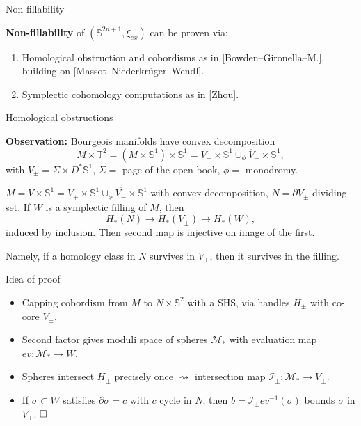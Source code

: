 \documentclass{beamer}
\begin{document}
\begin{frame}{Non-fillability}

\textbf{Non-fillability} of $(\mathbb S^{2n+1},\xi_{ex})$ can be proven via:

\begin{enumerate}
    \item Homological obstruction and cobordisms as in [Bowden--Gironella--M.], building on [Massot--Niederkr\"uger--Wendl].
    \item Symplectic cohomology computations as in [Zhou].
\end{enumerate}

\end{frame}

\begin{frame}{Homological obstructions}

\textbf{Observation:} Bourgeois manifolds have convex decomposition $$M\times \mathbb T^2=(M\times \mathbb S^1)\times \mathbb S^1= V_+\times \mathbb S^1 \cup_\phi \overline{V}_-\times \mathbb S^1,$$ with $V_\pm=\Sigma \times D^*\mathbb S^1$, $\Sigma=$ page of the open book, $\phi=$ monodromy.

\pause

\begin{theorem}

$M=V\times \mathbb S^1=V_+\times \mathbb S^1\cup_\phi \overline{V_-}\times \mathbb S^1$ with convex decomposition, $N=\partial V_\pm$ dividing set. If $W$ is a symplectic filling of $M$, then
$$
H_*(N)\rightarrow H_*(V_\pm) \rightarrow H_*(W),
$$
induced by inclusion. Then second map is injective on image of the first.
\end{theorem}

Namely, if a homology class in $N$ survives in $V_\pm$, then it survives in the filling.
    
\end{frame}

\begin{frame}{Idea of proof}

\begin{itemize}
\item Capping cobordism from $M$ to $N\times \mathbb S^2$ with a SHS, via handles $H_\pm$ with co-core $V_\pm$. 

\pause

\item Second factor gives moduli space of spheres $\mathcal M_*$ with evaluation map $ev: \mathcal M_*\rightarrow W$. 

\pause

\item Spheres intersect $H_\pm$ precisely once $\rightsquigarrow$ intersection map $\mathcal I_\pm:\mathcal M_*\rightarrow V_\pm$.

\pause

\item If $\sigma \subset W$ satisfies $\partial \sigma=c$ with $c$ cycle in $N$, then $b=\mathcal I_\pm ev^{-1}(\sigma)$ bounds $\sigma$ in $V_\pm$. $\hfill\square$ 

\end{itemize}
    
\end{frame}
\end{document}
